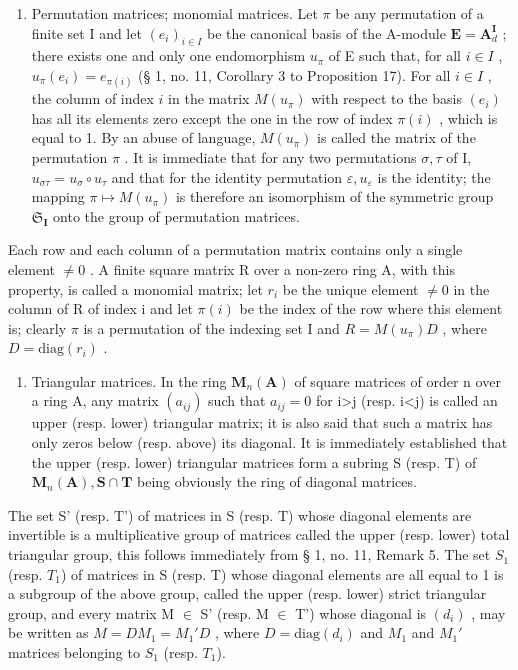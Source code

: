 \begin{enumerate}
\def\labelenumi{\Roman{enumi}.}
\setcounter{enumi}{1}
\tightlist
\item
  Permutation matrices; monomial matrices. Let \(\pi\) be any permutation of a finite set I and let \((e_i)_{i\in I}\) be the canonical basis of the A-module \(\mathbf{E} = \mathbf{A}_d^{\mathbf{I}}\) ; there exists one and only one endomorphism \(u_{\pi}\) of E such that, for all \(i\in I\) , \(u_{\pi}(e_i) = e_{\pi(i)}\) (§ 1, no. 11, Corollary 3 to Proposition 17). For all \(i\in I\) , the column of index \(i\) in the matrix \(M(u_{\pi})\) with respect to the basis \((e_i)\) has all its elements zero except the one in the row of index \(\pi(i)\) , which is equal to 1. By an abuse of language, \(M(u_{\pi})\) is called the matrix of the permutation \(\pi\) . It is immediate that for any two permutations \(\sigma, \tau\) of I, \(u_{\sigma \tau} = u_{\sigma} \circ u_{\tau}\) and that for the identity permutation \(\varepsilon, u_{\varepsilon}\) is the identity; the mapping \(\pi \mapsto M(u_{\pi})\) is therefore an isomorphism of the symmetric group \(\mathfrak{S}_{\mathbf{I}}\) onto the group of permutation matrices.
\end{enumerate}

Each row and each column of a permutation matrix contains only a single element \(\neq0\) . A finite square matrix R over a non-zero ring A, with this property, is called a monomial matrix; let \(r_{i}\) be the unique element \(\neq0\) in the column of R of index i and let \(\pi(i)\) be the index of the row where this element is; clearly \(\pi\) is a permutation of the indexing set I and \(R=M(u_{\pi})D\) , where \(D=\mathrm{diag}(r_{i})\) .

\begin{enumerate}
\def\labelenumi{\Roman{enumi}.}
\setcounter{enumi}{2}
\tightlist
\item
  Triangular matrices. In the ring \(\mathbf{M}_{n}(\mathbf{A})\) of square matrices of order n over a ring A, any matrix \((a_{ij})\) such that \(a_{ij}=0\) for i\textgreater j (resp. i\textless j) is called an upper (resp. lower) triangular matrix; it is also said that such a matrix has only zeros below (resp. above) its diagonal. It is immediately established that the upper (resp. lower) triangular matrices form a subring S (resp. T) of \(\mathbf{M}_{n}(\mathbf{A}),\mathbf{S}\cap\mathbf{T}\) being obviously the ring of diagonal matrices.
\end{enumerate}

The set S' (resp. T') of matrices in S (resp. T) whose diagonal elements are invertible is a multiplicative group of matrices called the upper (resp. lower) total triangular group, this follows immediately from § 1, no. 11, Remark 5. The set \(S_{1}\) (resp. \(T_{1}\)) of matrices in S (resp. T) whose diagonal elements are all equal to 1 is a subgroup of the above group, called the upper (resp. lower) strict triangular group, and every matrix M \ensuremath{\in} S' (resp. M \ensuremath{\in} T') whose diagonal is \((d_{i})\) , may be written as \(M = DM_{1} = M_{1}'D\) , where \(D = \mathrm{diag}(d_{i})\) and \(M_{1}\) and \(M_{1}'\) matrices belonging to \(S_{1}\) (resp. \(T_{1}\)).


